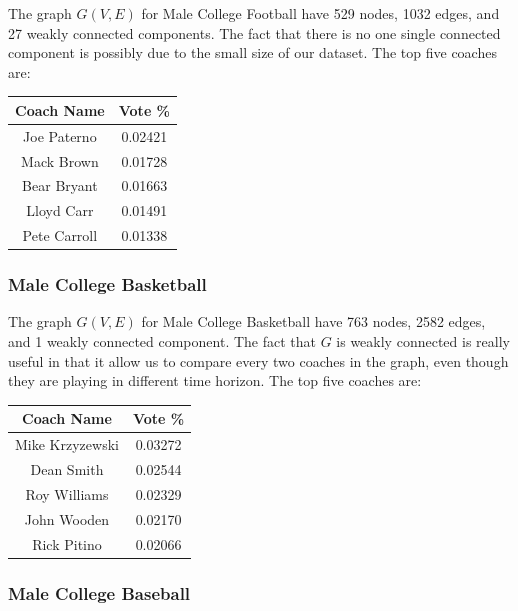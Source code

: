 \documentclass[11pt,notitlepage]{article}
\begin{document}
\noindent The graph $G(V, E)$ for Male College Football have 529 nodes, 1032 edges, and 27 weakly connected components. The fact that there is no one single connected component is possibly due to the small size of our dataset. The top five coaches are:

\begin{center}
\begin{tabular}{ | c | c | }
\hline
Coach Name   & Vote \% \\\hline
Joe Paterno  & 0.02421 \\\hline
Mack Brown   & 0.01728 \\\hline
Bear Bryant  & 0.01663 \\\hline
Lloyd Carr   & 0.01491 \\\hline
Pete Carroll & 0.01338 \\
\hline
\end{tabular}
\end{center}

\subsubsection*{Male College Basketball}

\noindent The graph $G(V, E)$ for Male College Basketball have 763 nodes, 2582 edges, and 1 weakly connected component. The fact that $G$ is weakly connected is really useful in that it allow us to compare every two coaches in the graph, even though they are playing in different time horizon. The top five coaches are:

\begin{center}
\begin{tabular}{ | c | c | }
\hline
Coach Name  & Vote \% \\\hline
Mike Krzyzewski & 0.03272 \\\hline
Dean Smith  & 0.02544 \\\hline
Roy Williams & 0.02329 \\\hline
John Wooden  & 0.02170 \\\hline
Rick Pitino  & 0.02066 \\
\hline
\end{tabular}
\end{center}

\subsubsection*{Male College Baseball}
\end{document}
